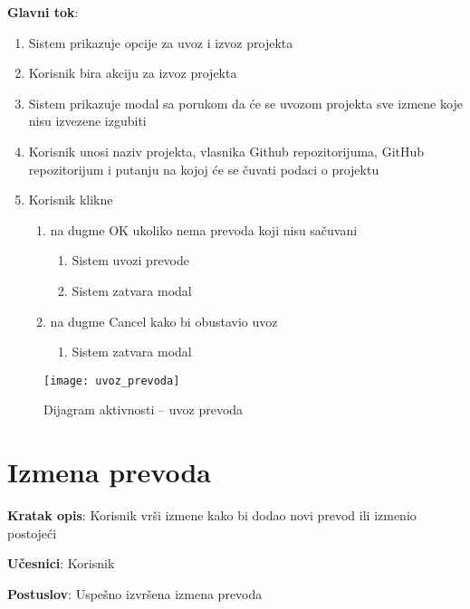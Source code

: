 \textbf{Glavni tok}:
\begin{enumerate}
    \item Sistem prikazuje opcije za uvoz i izvoz projekta
    \item Korisnik bira akciju za izvoz projekta
    \item Sistem prikazuje modal sa porukom da će se uvozom projekta sve 
    izmene koje nisu izvezene izgubiti
    \item Korisnik unosi naziv projekta, vlasnika Github repozitorijuma, 
    GitHub repozitorijum i putanju na kojoj će se čuvati podaci o projektu
    \item Korisnik klikne
    \begin{enumerate}
        \item na dugme OK ukoliko nema prevoda koji nisu sačuvani
        
        \begin{enumerate}
            \item Sistem uvozi prevode
            \item Sistem zatvara modal
        \end{enumerate}        
        
        \item na dugme Cancel kako bi obustavio uvoz
        
        \begin{enumerate}
            \item Sistem zatvara modal
        \end{enumerate}
    \end{enumerate}        
\end{enumerate}

\begin{figure}[H]
    \centering
    \texttt{[image: uvoz\_prevoda]}
    \caption{Dijagram aktivnosti -- uvoz prevoda}
\end{figure}


\section{Izmena prevoda}

\textbf{Kratak opis}: Korisnik vrši izmene kako bi dodao novi prevod ili izmenio postojeći

\textbf{Učesnici}: Korisnik

\textbf{Postuslov}: Uspešno izvršena izmena prevoda

